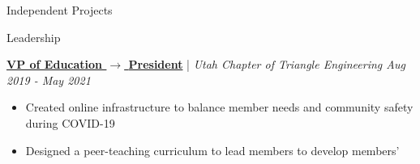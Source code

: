 \documentclass{resume/resume}
\begin{document}
\begin{rSection}{Independent Projects}

\end{rSection}

\begin{rSection}{Leadership}
 
  \href{https://github.com/UtahTriangle/Laws}{\bf VP of Education $\rightarrow$ \bf President} | {\em Utah Chapter of Triangle Engineering \hfill Aug 2019 - May 2021}
  \vspace{-6pt}
  \begin{itemize}[nosep]
    \item Created online infrastructure to balance member needs and community safety during COVID-19
    \item Designed a peer-teaching curriculum to lead members to develop members' 
    
  \end{itemize}

  

\end{rSection}
\end{document}

